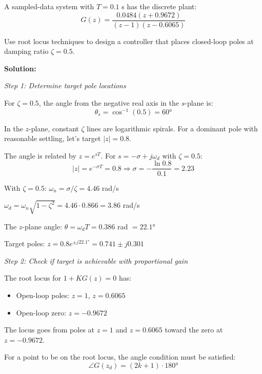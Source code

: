 \begin{example}
\label{ex:discrete_root_locus}

A sampled-data system with $T = 0.1$ s has the discrete plant:
\begin{equation}
G(z) = \frac{0.0484(z + 0.9672)}{(z - 1)(z - 0.6065)}
\end{equation}

Use root locus techniques to design a controller that places closed-loop poles at damping ratio $\zeta = 0.5$.

\textbf{Solution:}

\textit{Step 1: Determine target pole locations}

For $\zeta = 0.5$, the angle from the negative real axis in the $s$-plane is:
\begin{equation}
\theta_s = \cos^{-1}(0.5) = 60°
\end{equation}

In the $z$-plane, constant $\zeta$ lines are logarithmic spirals. For a dominant pole with reasonable settling, let's target $|z| = 0.8$.

The angle is related by $z = e^{sT}$. For $s = -\sigma + j\omega_d$ with $\zeta = 0.5$:
\begin{equation}
|z| = e^{-\sigma T} = 0.8 \Rightarrow \sigma = -\frac{\ln 0.8}{0.1} = 2.23
\end{equation}

With $\zeta = 0.5$: $\omega_n = \sigma/\zeta = 4.46$ rad/s

$\omega_d = \omega_n\sqrt{1-\zeta^2} = 4.46 \cdot 0.866 = 3.86$ rad/s

The $z$-plane angle: $\theta = \omega_d T = 0.386$ rad $= 22.1°$

Target poles: $z = 0.8 e^{\pm j22.1°} = 0.741 \pm j0.301$

\textit{Step 2: Check if target is achievable with proportional gain}

The root locus for $1 + KG(z) = 0$ has:
\begin{itemize}
    \item Open-loop poles: $z = 1$, $z = 0.6065$
    \item Open-loop zero: $z = -0.9672$
\end{itemize}

The locus goes from poles at $z = 1$ and $z = 0.6065$ toward the zero at $z = -0.9672$.

For a point to be on the root locus, the angle condition must be satisfied:
\begin{equation}
\angle G(z_d) = (2k+1) \cdot 180°
\end{equation}


\end{example}
